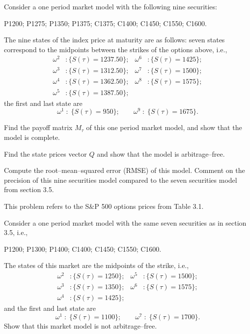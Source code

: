 \begin{exercises}
Consider a one period market model with the following nine securities:
\begin{center}
P1200; P1275; P1350; P1375; C1375; C1400; C1450; C1550; C1600.
\end{center}
The nine states of the index price at maturity are as follows: seven
states correspond to the midpoints between the strikes of the options
above, i.e.,
\begin{align*}
\omega^2 &: \{S(\tau) = 1237.50\}; & \omega^6 &: \{S(\tau) = 1425\}; \\
\omega^3 &: \{S(\tau) = 1312.50\}; & \omega^7 &: \{S(\tau) = 1500\}; \\
\omega^4 &: \{S(\tau) = 1362.50\}; & \omega^8 &: \{S(\tau) = 1575\}; \\
\omega^5 &: \{S(\tau) = 1387.50\}; & &
\end{align*}
the first and last state are
\[
\omega^1 \;:\; \{S(\tau) = 950\}; \qquad \omega^9 \;:\; \{S(\tau) = 1675\}.
\]
\begin{subparts}
\item Find the payoff matrix $M_\tau$ of this one period market model, and
show that the model is complete.
\item Find the state prices vector $Q$ and show that the model is
arbitrage--free.
\item Compute the root--mean--squared error (RMSE) of this model. Comment
on the precision of this nine securities model compared to the seven
securities model from section 3.5.
\end{subparts}

\item This problem refers to the S\&P 500 options prices from Table 3.1.

Consider a one period market model with the same seven securities as in
section 3.5, i.e.,
\begin{center}
P1200; P1300; P1400; C1400; C1450; C1550; C1600.
\end{center}
The states of this market are the midpoints of the strike, i.e.,
\begin{align*}
\omega^2 &: \{S(\tau) = 1250\}; & \omega^5 &: \{S(\tau) = 1500\}; \\
\omega^3 &: \{S(\tau) = 1350\}; & \omega^6 &: \{S(\tau) = 1575\}; \\
\omega^4 &: \{S(\tau) = 1425\}; & &
\end{align*}
and the first and last state are
\[
\omega^1 \;:\; \{S(\tau) = 1100\}; \qquad \omega^7 \;:\; \{S(\tau) = 1700\}.
\]
Show that this market model is not arbitrage--free.

\end{exercises}

